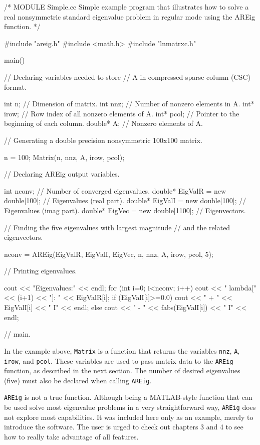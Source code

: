 \begin{cppcode}
/*
MODULE Simple.cc
Simple example program that illustrates how to solve a real
nonsymmetric standard eigenvalue problem in regular mode
using the AREig function.
*/

#include "areig.h"
#include <math.h>
#include "lnmatrxc.h"

main()
{
	// Declaring variables needed to store 
	// A in compressed sparse column (CSC) format.
	
	int     n;      // Dimension of matrix.
	int     nnz;    // Number of nonzero elements in A.
	int*    irow;   // Row index of all nonzero elements of A.
	int*    pcol;   // Pointer to the beginning of each column.
	double* A;      // Nonzero elements of A.
	
	// Generating a double precision nonsymmetric 100x100 matrix.
	
	n = 100;
	Matrix(n, nnz, A, irow, pcol);
	
	// Declaring AREig output variables.
	
	int     nconv;                // Number of converged eigenvalues.
	double* EigValR = new double[100];    // Eigenvalues (real part).
	double* EigValI = new double[100];    // Eigenvalues (imag part).
	double* EigVec  = new double[1100];   // Eigenvectors.
	
	// Finding the five eigenvalues with largest magnitude
	// and the related eigenvectors.
	
	nconv = AREig(EigValR, EigValI, EigVec, n, nnz, A, irow, pcol, 5);
	
	// Printing eigenvalues.
	
	cout << "Eigenvalues:" << endl;
	for (int i=0; i<nconv; i++) {
		cout << "  lambda[" << (i+1) << "]: " << EigValR[i];
		if (EigValI[i]>=0.0) {
			cout << " + " << EigValI[i] << " I" << endl;
		}
		else {
			cout << " - " << fabs(EigValI[i]) << " I" << endl;
		}
	}
} // main.
\end{cppcode}
In the example above, \texttt{Matrix} is a function that returns the variables \texttt{nnz}, \texttt{A}, \texttt{irow}, and \texttt{pcol}. These variables are used to pass matrix data to the \texttt{AREig} function, as described in the next section. The number of desired eigenvalues (five) must also be declared when calling \texttt{AREig}.

\texttt{AREig} is not a true \ARPP{} function. Although being a MATLAB-style function that can be used solve most eigenvalue problems in a very straightforward way, \texttt{AREig} does not explore most \ARPP{} capabilities. It was included here only as an example, merely to introduce the software. The user is urged to check out chapters 3 and 4 to see how to really take advantage of all \ARPP{} features.

